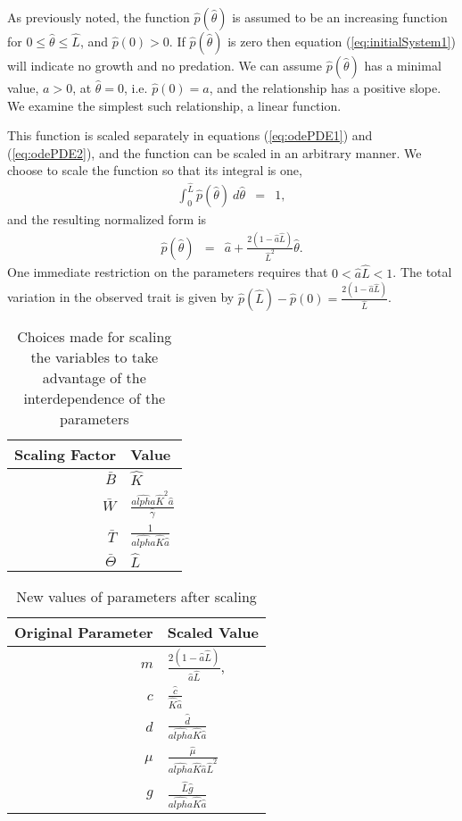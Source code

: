 \documentclass[review]{elsarticle}
\def\alpha{alpha}%
\newcommand{\origAlpha}{\hat{\alpha}}
\newcommand{\origK}{\hat{K}}
\newcommand{\origGamma}{\hat{\gamma}}
\newcommand{\origA}{\hat{a}}
\newcommand{\origC}{\hat{c}}
\newcommand{\origD}{\hat{d}}
\newcommand{\origG}{\hat{g}}
\newcommand{\origL}{\hat{L}}
\newcommand{\origP}[1]{\hat{p}(#1)}
\newcommand{\origTheta}{\hat{\theta}}
\newcommand{\origMu}{\hat{\mu}}
\begin{document}
As previously noted, the function $\origP{\origTheta}$ is assumed to be an
increasing function for $0\leq\origTheta\leq \origL$, and $\origP{0}>0$. If
$\origP{\origTheta}$ is zero then equation (\ref{eq:initialSystem1}) will
indicate no growth and no predation. We can assume $\origP{\origTheta}$ has a
minimal value, $a>0$,  at $\origTheta = 0$, i.e. $\origP{0}=a$, and the relationship has a positive slope. We
examine the simplest such relationship, a linear function.

This function is scaled separately in equations (\ref{eq:odePDE1}) and
(\ref{eq:odePDE2}), and the function can be scaled in an arbitrary
manner. We choose to scale the function so that its integral is one,
\begin{eqnarray*}
  \int^{\origL}_0 \origP{\origTheta} ~ d\origTheta & = & 1,
\end{eqnarray*}
and the resulting normalized form is
\begin{eqnarray}
  \label{eq:linearFormP}
  \origP{\origTheta} & = & \origA + \frac{2(1-\origA\origL)}{\origL^2} \origTheta.
\end{eqnarray}
One immediate restriction on the parameters requires that
$0<\origA\origL<1$. The total variation in the observed trait is given by 
$\origP{\origL} - \origP{0} =\frac{2(1-\origA\origL)}{\origL}$.

\begin{table}[h]
  \centering
  \begin{tabular}{r|l}
    Scaling Factor & Value \\ \hline
    $\bar{B}$ & $\origK$ \\ [10pt]
    $\bar{W}$ & $\frac{\origAlpha \origK^2 \origA}{\origGamma}$ \\  [10pt]
    $\bar{T}$ & $\frac{1}{\origAlpha \origK \origA}$ \\  [10pt]
    $\bar{\Theta}$ & $\origL$
  \end{tabular}
  \caption{Choices made for scaling the variables to take advantage of the interdependence of the parameters}
  \label{tab:scalingChoices}
\end{table}

\begin{table}[h]
  \centering
  \begin{tabular}{r|l}
  Original Parameter & Scaled Value \\ \hline
    $m$   & $\frac{2(1-\origA\origL)}{\origA\origL}$, \\  [10pt]
    $c$   & $\frac{\origC}{\origK\origA}$ \\  [10pt]
    $d$   & $\frac{\origD}{\origAlpha\origK\origA}$ \\  [10pt]
    $\mu$ & $\frac{\origMu}{\origAlpha\origK\origA\origL^2}$  \\  [10pt]
    $g$   & $\frac{\origL\origG}{\origAlpha\origK\origA}$
  \end{tabular}
  \caption{New values of parameters after scaling}
  \label{tab:newParameters}
\end{table}
\end{document}
